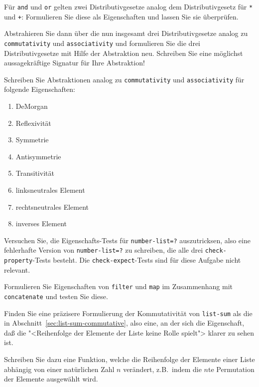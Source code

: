 \begin{aufgabe}
  \label{aufgabe:boolean-distrib}
  Für \texttt{and} und \texttt{or} gelten zwei Distributivgesetze
  analog dem Distributivgesetz für \texttt{*} und \texttt{+}:
  Formulieren Sie diese als Eigenschaften und lassen Sie \drscheme{}
  sie überprüfen.

  Abstrahieren Sie dann über die nun insgesamt drei Distributivgesetze
  analog zu \texttt{commutativity} und \texttt{associativity} und
  formulieren Sie die drei Distributivgesetze mit Hilfe der
  Abstraktion neu.  Schreiben Sie eine möglichst aussagekräftige
  Signatur für Ihre Abstraktion!
\end{aufgabe}

\begin{aufgabe}  Schreiben Sie Abstraktionen analog zu \texttt{commutativity} und
  \texttt{associativity} für folgende Eigenschaften:
  \begin{enumerate}
  \item DeMorgan
  \item Reflexivität
  \item Symmetrie
  \item Antisymmetrie
  \item Transitivität
  \item linksneutrales Element
  \item rechtsneutrales Element
  \item inverses Element
  \end{enumerate}
\end{aufgabe}


\begin{aufgabe}
  Versuchen Sie, die Eigenschafts-Tests für \texttt{number-list=?}
  auszutricksen, also eine fehlerhafte Version von
  \texttt{number-list=?} zu schreiben, die alle drei
  \texttt{check-property}-Tests besteht.
  Die \texttt{check-expect}-Tests sind für diese Aufgabe nicht relevant.
\end{aufgabe}

\begin{aufgabe}
  Formulieren Sie Eigenschaften von \texttt{filter} und \texttt{map}
  im Zusammenhang mit \texttt{concatenate} und testen Sie diese.
\end{aufgabe}

\begin{aufgabe}
  Finden Sie eine präzisere Formulierung der Kommutativität von
  \texttt{list-sum} als die in
  Abschnitt~\ref{sec:list-sum-commutative}, also eine, an der sich die
  Eigenschaft, daß die "<Reihenfolge der Elemente der Liste keine
  Rolle spielt"> klarer zu sehen ist.

  Schreiben Sie dazu eine Funktion, welche die Reihenfolge der
  Elemente einer Liste abhängig von einer natürlichen Zahl $n$
  verändert, z.B.\ indem die $n$te Permutation der Elemente ausgewählt
  wird.
\end{aufgabe}

